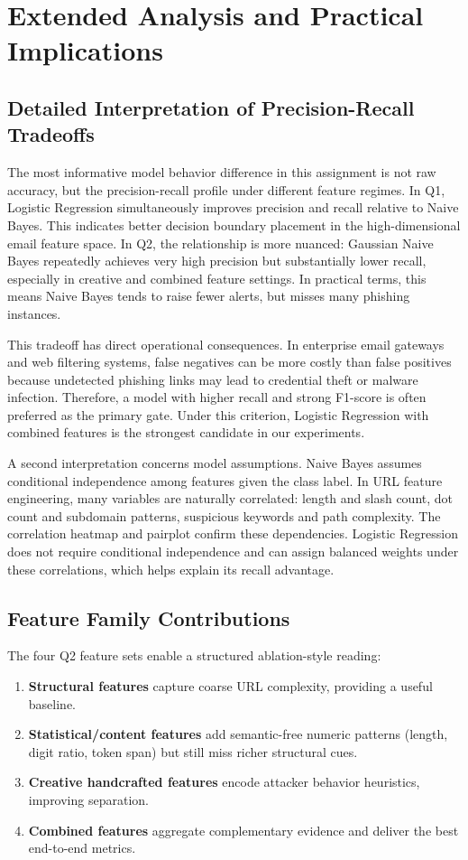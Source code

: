 \section{Extended Analysis and Practical Implications}

\subsection{Detailed Interpretation of Precision-Recall Tradeoffs}

The most informative model behavior difference in this assignment is not raw accuracy, but the precision-recall profile under different feature regimes. In Q1, Logistic Regression simultaneously improves precision and recall relative to Naive Bayes. This indicates better decision boundary placement in the high-dimensional email feature space. In Q2, the relationship is more nuanced: Gaussian Naive Bayes repeatedly achieves very high precision but substantially lower recall, especially in creative and combined feature settings. In practical terms, this means Naive Bayes tends to raise fewer alerts, but misses many phishing instances.

This tradeoff has direct operational consequences. In enterprise email gateways and web filtering systems, false negatives can be more costly than false positives because undetected phishing links may lead to credential theft or malware infection. Therefore, a model with higher recall and strong F1-score is often preferred as the primary gate. Under this criterion, Logistic Regression with combined features is the strongest candidate in our experiments.

A second interpretation concerns model assumptions. Naive Bayes assumes conditional independence among features given the class label. In URL feature engineering, many variables are naturally correlated: length and slash count, dot count and subdomain patterns, suspicious keywords and path complexity. The correlation heatmap and pairplot confirm these dependencies. Logistic Regression does not require conditional independence and can assign balanced weights under these correlations, which helps explain its recall advantage.

\subsection{Feature Family Contributions}

The four Q2 feature sets enable a structured ablation-style reading:
\begin{enumerate}
    \item \textbf{Structural features} capture coarse URL complexity, providing a useful baseline.
    \item \textbf{Statistical/content features} add semantic-free numeric patterns (length, digit ratio, token span) but still miss richer structural cues.
    \item \textbf{Creative handcrafted features} encode attacker behavior heuristics, improving separation.
    \item \textbf{Combined features} aggregate complementary evidence and deliver the best end-to-end metrics.
\end{enumerate}

